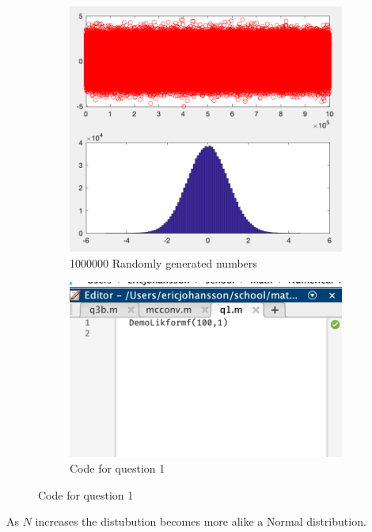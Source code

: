 \documentclass{article}
\begin{document}
\begin{figure}[H]
    \begin{subfigure}[h]{0.4\linewidth}
        \includegraphics[width=\linewidth]{./imgs/q1a_1000000.png}
        \caption{1000000 Randomly generated numbers}
    \end{subfigure}
    \hfill
    \begin{subfigure}[h]{0.4\linewidth}
        \includegraphics[width=\linewidth]{./imgs/q1_code.png}
        \caption{Code for question 1}
    \end{subfigure}
\end{figure}
As \( N \) increases the distubution becomes more alike a Normal distribution.
\end{document}
